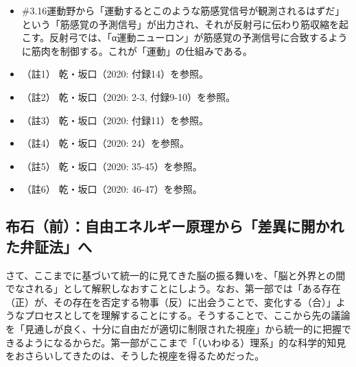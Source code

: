 \begin{note}{}
  \begin{itemize}
    \tightlist
    \item{\#3.16}運動野から「運動するとこのような筋感覚信号が観測されるはずだ」という「筋感覚の予測信号」が出力され、それが反射弓に伝わり筋収縮を起こす。反射弓では、「α運動ニューロン」が筋感覚の予測信号に合致するように筋肉を制御する。これが「運動」の仕組みである。
  \end{itemize}
\end{note}

\begin{itemize}
\tightlist
\item
  （註1） 乾・坂口（2020: 付録14）\cite{InuiAndSakaguchi}を参照。
\item
  （註2） 乾・坂口（2020: 2-3, 付録9-10）\cite{InuiAndSakaguchi}を参照。
\item
  （註3） 乾・坂口（2020: 付録11）\cite{InuiAndSakaguchi}を参照。
\item
  （註4） 乾・坂口（2020: 24）\cite{InuiAndSakaguchi}を参照。
\item
  （註5） 乾・坂口（2020: 35-45）\cite{InuiAndSakaguchi}を参照。
\item
  （註6） 乾・坂口（2020: 46-47）\cite{InuiAndSakaguchi}を参照。
\end{itemize}

\subsection{布石（前）：自由エネルギー原理から「差異に開かれた弁証法」へ}\label{ux5e03ux77f3ux524dux81eaux7531ux30a8ux30cdux30ebux30aeux30fcux539fux7406ux304bux3089ux5deeux7570ux306bux958bux304bux308cux305fux5f01ux8a3cux6cd5ux3078}

さて、ここまでに基づいて統一的に見てきた脳の振る舞いを、「脳と外界との間でなされる」として解釈しなおすことにしよう。なお、第一部では「ある存在（正）が、その存在を否定する物事（反）に出会うことで、変化する（合）」ようなプロセスとしてを理解することにする。そうすることで、ここから先の議論を「見通しが良く、十分に自由だが適切に制限された視座」から統一的に把握できるようになるからだ。第一部がここまで「（いわゆる）理系」的な科学的知見をおさらいしてきたのは、そうした視座を得るためだった。

